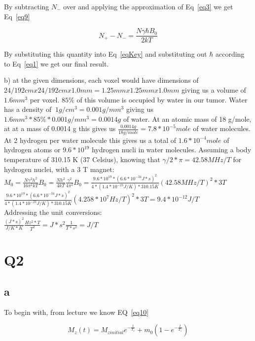 \documentclass[12pt]{article}
\begin{document}
By subtracting $N_-$ over and applying the approximation of Eq~\ref{eq3} we get Eq~\ref{eq9}

\begin{equation}
N_+ - N_- = \frac{N \gamma \hbar  B_0}{2kT}
\label{eq9}
\end{equation}

By substituting this quantity into Eq~\ref{eqKey} and substituting out $\hbar$ according to Eq~\ref{eq1} we get our final result.

b) at the given dimensions, each voxel would have dimensions of $24/192 cmx 24/192 cmx 1.0mm = 1.25 mm x 1.25 mm x 1.0 mm$ giving us a volume of $1.6 mm^3$ per voxel. $85\%$ of this volume is occupied by water in our tumor. Water has a density of $~1 g/cm^3 = 0.001 g/mm^3$ giving us $1.6 mm^3 * 85\% * 0.001g/mm^3 = 0.0014 g$ of water. At an atomic mass of 18 g/mole, at at a mass of 0.0014 g this gives us $\frac{0.0014 g}{18 g/mole} = 7.8*10^{-5}mole$ of water molecules. At 2 hydrogen per water molecule this gives us a total of $1.6*10^{-4} mole$ of hydrogen atoms or $9.6 * 10^{19} $ hydrogen nucli in water molecules. Assuming a body temperature of 310.15 K (37 Celsius), knowing that $\gamma/2*\pi = 42.58 MHz/T$ for hydrogen nuclei, with a 3 T magnet:\\ $M_0 = \frac{N\gamma^2h^2}{16\pi^2kT}B_0 =\frac{Nh^2}{4kT}\frac{\gamma^2}{4\pi^2}B_0 = \frac{9.6 * 10^{19}* (6.6*10^{-34} J*s)^2}{4*(1.4*10^{-23} J/K)*310.15 K}(42.58 MHz/T)^2*3T$\\
$\frac{9.6 * 10^{19}* (6.6*10^{-34} J*s)^2}{4*(1.4*10^{-23} J/K)*310.15 K}(4.258 * 10^7 Hz/T)^2*3T = 9.4*10^{-12}J/T$\\

Addressing the unit conversions:\\
$\frac{ (J*s)^2}{J/K*K}\frac{Hz^2*T}{T^2} = J*s^2\frac{1}{T*s^2} = J/T$


\section{Q2}
\subsection{a}
To begin with, from lecture we know EQ~\ref{eq10}

\begin{equation}
M_z(t) = M_{zinitial}  e^{-\frac{t}{T_1}} + m_0(1-e^{-\frac{t}{T_1}})
\label{eq10}
\end{equation}
\end{document}
